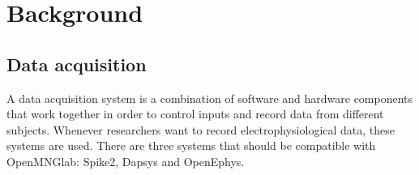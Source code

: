 \chapter{Background}
\label{background_chapter}

\section{Data acquisition} 
A data acquisition system is a combination of software and hardware components that work together in order to control inputs and record data from different subjects. Whenever researchers want to record electrophysiological data, these systems are used.
There are three systems that should be compatible with OpenMNGlab: Spike2, Dapsys and OpenEphys.

